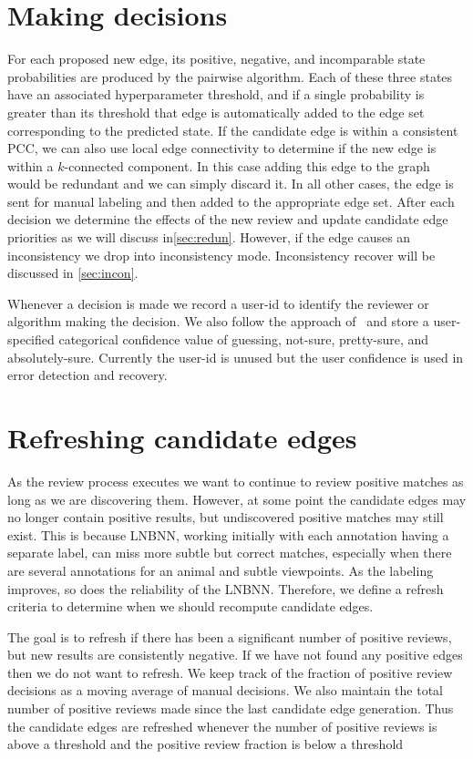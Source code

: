 \section{Making decisions}\label{sec:decision}

For each proposed new edge, its positive, negative, and incomparable state probabilities are produced by the
pairwise algorithm. Each of these three states have an associated hyperparameter threshold, and if a single
probability is greater than its threshold that edge is automatically added to the edge set corresponding to the
predicted state. If the candidate edge is within a consistent PCC, we can also use local edge connectivity to
determine if the new edge is within a $k$-connected component. In this case adding this edge to the graph would be
redundant and we can simply discard it. In all other cases, the edge is sent for manual labeling and then added to
the appropriate edge set. After each decision we determine the effects of the new review and update candidate edge
priorities as we will discuss in\cref{sec:redun}. However, if the edge causes an inconsistency we drop into
inconsistency mode. Inconsistency recover will be discussed in \cref{sec:incon}.

Whenever a decision is made we record a user-id to identify the reviewer or algorithm making the decision. We also
follow the approach of~\cite{branson_visual_2010} and store a user-specified categorical confidence value of
guessing, not-sure, pretty-sure, and absolutely-sure. Currently the user-id is unused but the user confidence is
used in error detection and recovery.


\section{Refreshing candidate edges}\label{sec:refresh}

As the review process executes we want to continue to review positive matches as long as we are discovering them.
However, at some point the candidate edges may no longer contain positive results, but undiscovered positive matches may
still exist. This is because LNBNN, working initially with each annotation having a separate label, can miss more subtle
but correct matches, especially when there are several annotations for an animal and subtle viewpoints. As the labeling
improves, so does the reliability of the LNBNN. Therefore, we define a refresh criteria to determine when we should
recompute candidate edges.

The goal is to refresh if there has been a significant number of positive reviews, but new results are consistently
negative. If we have not found any positive edges then we do not want to refresh. We keep track of the fraction of
positive review decisions as a moving average of manual decisions. We also maintain the total number of positive reviews
made since the last candidate edge generation. Thus the candidate edges are refreshed whenever the number of positive
reviews is above a threshold and the positive review fraction is below a threshold

